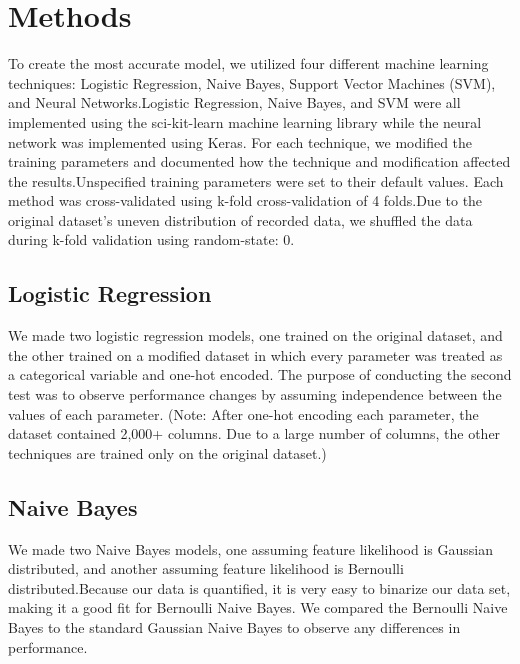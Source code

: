 \section{Methods}

To create the most accurate model, we utilized four different machine learning techniques: Logistic Regression, Naive Bayes, Support Vector Machines (SVM), and Neural Networks.\hspace{1pt}Logistic Regression, Naive Bayes, and SVM were all implemented using the sci-kit-learn machine learning library while the neural network was implemented using Keras. For each technique, we modified the training parameters and documented how the technique and modification affected the results.\hspace{1pt}Unspecified training parameters were set to their default values. Each method was cross-validated using k-fold cross-validation of 4 folds.\hspace{1pt}Due to the original dataset’s uneven distribution of recorded data, we shuffled the data during k-fold validation using random-state: 0. 

\subsection{Logistic Regression}

We made two logistic regression models, one trained on the original dataset, and the other trained on a modified dataset in which every parameter was treated as a categorical variable and one-hot encoded. The purpose of conducting the second test was to observe performance changes by assuming independence between the values of each parameter. (Note: After one-hot encoding each parameter, the dataset contained 2,000+ columns. Due to a large number of columns, the other techniques are trained only on the original dataset.)

\subsection{Naive Bayes}

We made two Naive Bayes models, one assuming feature likelihood is Gaussian distributed, and another assuming feature likelihood is Bernoulli distributed.\hspace{1pt}Because our data is quantified, it is very easy to binarize our data set, making it a good fit for Bernoulli Naive Bayes. We compared the Bernoulli Naive Bayes to the standard Gaussian Naive Bayes to observe any differences in performance.

